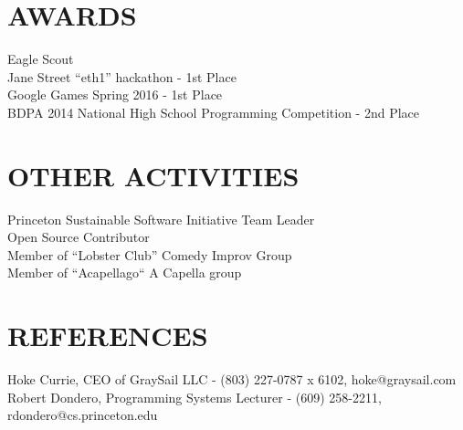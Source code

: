 \documentclass[margin]{res}
\begin{document}
\begin{resume}
\section{AWARDS}
            Eagle Scout \\
            Jane Street ``eth1'' hackathon - 1st Place \\
            Google Games Spring 2016 - 1st Place \\
            BDPA 2014 National High School Programming Competition - 2nd Place
 
\section{OTHER ACTIVITIES}
            Princeton Sustainable Software Initiative Team Leader \\
            Open Source Contributor \\
            Member of ``Lobster Club'' Comedy Improv Group\\
            Member of ``Acapellago`` A Capella group\\

\section{REFERENCES}
            Hoke Currie, CEO of GraySail LLC - (803) 227-0787 x 6102, hoke@graysail.com \\
            Robert Dondero, Programming Systems Lecturer - (609) 258-2211, rdondero@cs.princeton.edu
 

 
\end{resume} 
\end{document}
